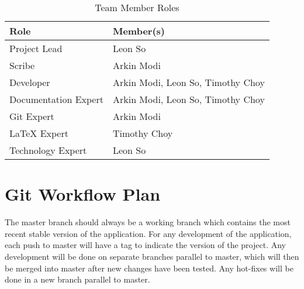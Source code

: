 \documentclass{article}
\begin{document}
\begin{table}[H]
    \centering
    \caption{Team Member Roles}
    \vspace{5pt}
    \begin{tabular}{|l|l|}
        \hline
        \textbf{Role} & \textbf{Member(s)} \\
        \hline
        Project Lead & Leon So\\
        \hline
        Scribe & Arkin Modi\\
        \hline
        Developer & Arkin Modi, Leon So, Timothy Choy \\
        \hline
        Documentation Expert & Arkin Modi, Leon So, Timothy Choy \\
        \hline
        Git Expert & Arkin Modi \\
        \hline
        LaTeX Expert & Timothy Choy \\
        \hline
        Technology Expert & Leon So \\
        \hline
    \end{tabular}
\end{table}


\section{Git Workflow Plan}
The master branch should always be a working branch which contains the most recent stable version of the application. For any development of the application, each push to master will have a tag to indicate the version of the project. Any development will be done on separate branches parallel to master, which will then be merged into master after new changes have been tested. Any hot-fixes will be done in a new branch parallel to master.
\end{document}
